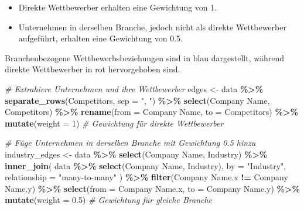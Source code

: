\documentclass[
]{article}
\newenvironment{Shaded}{\begin{snugshade}}{\end{snugshade}}
\newcommand{\AttributeTok}[1]{\textcolor[rgb]{0.13,0.29,0.53}{#1}}
\newcommand{\CommentTok}[1]{\textcolor[rgb]{0.56,0.35,0.01}{\textit{#1}}}
\newcommand{\DecValTok}[1]{\textcolor[rgb]{0.00,0.00,0.81}{#1}}
\newcommand{\FloatTok}[1]{\textcolor[rgb]{0.00,0.00,0.81}{#1}}
\newcommand{\FunctionTok}[1]{\textcolor[rgb]{0.13,0.29,0.53}{\textbf{#1}}}
\newcommand{\NormalTok}[1]{#1}
\newcommand{\OtherTok}[1]{\textcolor[rgb]{0.56,0.35,0.01}{#1}}
\newcommand{\SpecialCharTok}[1]{\textcolor[rgb]{0.81,0.36,0.00}{\textbf{#1}}}
\newcommand{\StringTok}[1]{\textcolor[rgb]{0.31,0.60,0.02}{#1}}
\providecommand{\tightlist}{%
  \setlength{\itemsep}{0pt}\setlength{\parskip}{0pt}}
\begin{document}
\begin{itemize}
\tightlist
\item
  Direkte Wettbewerber erhalten eine Gewichtung von 1.
\item
  Unternehmen in derselben Branche, jedoch nicht als direkte
  Wettbewerber aufgeführt, erhalten eine Gewichtung von 0.5.
\end{itemize}

Branchenbezogene Wettbewerbsbeziehungen sind in blau dargestellt,
während direkte Wettbewerber in rot hervorgehoben sind.

\begin{Shaded}
\begin{Highlighting}[]
\CommentTok{\# Extrahiere Unternehmen und ihre Wettbewerber}
\NormalTok{edges }\OtherTok{\textless{}{-}}\NormalTok{ data }\SpecialCharTok{\%\textgreater{}\%}
  \FunctionTok{separate\_rows}\NormalTok{(Competitors, }\AttributeTok{sep =} \StringTok{", "}\NormalTok{) }\SpecialCharTok{\%\textgreater{}\%}
  \FunctionTok{select}\NormalTok{(}\StringTok{\textasciigrave{}}\AttributeTok{Company Name}\StringTok{\textasciigrave{}}\NormalTok{, Competitors) }\SpecialCharTok{\%\textgreater{}\%}
  \FunctionTok{rename}\NormalTok{(}\AttributeTok{from =} \StringTok{\textasciigrave{}}\AttributeTok{Company Name}\StringTok{\textasciigrave{}}\NormalTok{, }\AttributeTok{to =}\NormalTok{ Competitors) }\SpecialCharTok{\%\textgreater{}\%}
  \FunctionTok{mutate}\NormalTok{(}\AttributeTok{weight =} \DecValTok{1}\NormalTok{)  }\CommentTok{\# Gewichtung für direkte Wettbewerber}

\CommentTok{\# Füge Unternehmen in derselben Branche mit Gewichtung 0.5 hinzu}
\NormalTok{industry\_edges }\OtherTok{\textless{}{-}}\NormalTok{ data }\SpecialCharTok{\%\textgreater{}\%}
  \FunctionTok{select}\NormalTok{(}\StringTok{\textasciigrave{}}\AttributeTok{Company Name}\StringTok{\textasciigrave{}}\NormalTok{, Industry) }\SpecialCharTok{\%\textgreater{}\%}
  \FunctionTok{inner\_join}\NormalTok{(}
\NormalTok{    data }\SpecialCharTok{\%\textgreater{}\%} \FunctionTok{select}\NormalTok{(}\StringTok{\textasciigrave{}}\AttributeTok{Company Name}\StringTok{\textasciigrave{}}\NormalTok{, Industry),}
    \AttributeTok{by =} \StringTok{"Industry"}\NormalTok{,}
    \AttributeTok{relationship =} \StringTok{"many{-}to{-}many"}
\NormalTok{  ) }\SpecialCharTok{\%\textgreater{}\%}
  \FunctionTok{filter}\NormalTok{(}\StringTok{\textasciigrave{}}\AttributeTok{Company Name.x}\StringTok{\textasciigrave{}} \SpecialCharTok{!=} \StringTok{\textasciigrave{}}\AttributeTok{Company Name.y}\StringTok{\textasciigrave{}}\NormalTok{) }\SpecialCharTok{\%\textgreater{}\%}
  \FunctionTok{select}\NormalTok{(}\AttributeTok{from =} \StringTok{\textasciigrave{}}\AttributeTok{Company Name.x}\StringTok{\textasciigrave{}}\NormalTok{, }\AttributeTok{to =} \StringTok{\textasciigrave{}}\AttributeTok{Company Name.y}\StringTok{\textasciigrave{}}\NormalTok{) }\SpecialCharTok{\%\textgreater{}\%}
  \FunctionTok{mutate}\NormalTok{(}\AttributeTok{weight =} \FloatTok{0.5}\NormalTok{)  }\CommentTok{\# Gewichtung für gleiche Branche}


\end{Highlighting}
\end{Shaded}
\end{document}

